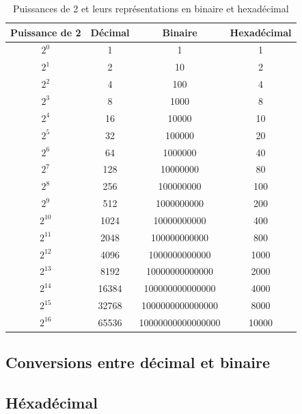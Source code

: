 \documentclass[12pt]{article}
\begin{document}
\begin{table}[h]
    \centering
    \begin{tabular}{|c|c|c|c|}
    \hline
    Puissance de 2 & Décimal & Binaire & Hexadécimal \\
    \hline
    $2^0$  & 1        & 1                & 1 \\
    \hline
    $2^1$  & 2        & 10               & 2 \\
    \hline
    $2^2$  & 4        & 100              & 4 \\
    \hline
    $2^3$  & 8        & 1000             & 8 \\
    \hline
    $2^4$  & 16       & 10000            & 10 \\
    \hline
    $2^5$  & 32       & 100000           & 20 \\
    \hline
    $2^6$  & 64       & 1000000          & 40 \\
    \hline
    $2^7$  & 128      & 10000000         & 80 \\
    \hline
    $2^8$  & 256      & 100000000        & 100 \\
    \hline
    $2^9$  & 512      & 1000000000       & 200 \\
    \hline
    $2^{10}$ & 1024   & 10000000000      & 400 \\
    \hline
    $2^{11}$ & 2048   & 100000000000     & 800 \\
    \hline
    $2^{12}$ & 4096   & 1000000000000    & 1000 \\
    \hline
    $2^{13}$ & 8192   & 10000000000000   & 2000 \\
    \hline
    $2^{14}$ & 16384  & 100000000000000  & 4000 \\
    \hline
    $2^{15}$ & 32768  & 1000000000000000 & 8000 \\
    \hline
    $2^{16}$ & 65536  & 10000000000000000& 10000 \\
    \hline
    \end{tabular}
    \caption{Puissances de 2 et leurs représentations en binaire et hexadécimal}
    \label{tab:puissances_de_2}
\end{table}

\subsection{Conversions entre décimal et binaire}

\subsection{Héxadécimal}
\end{document}
